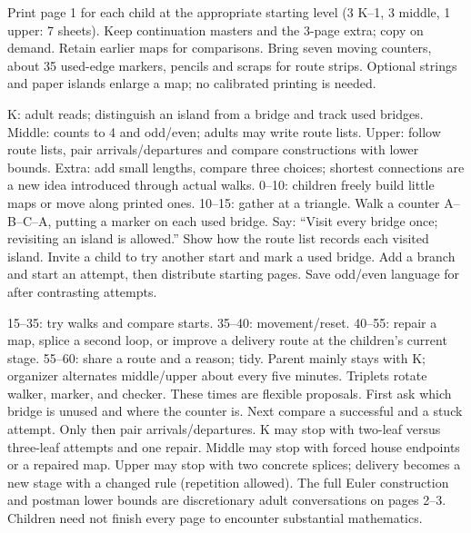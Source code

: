\documentclass[11pt]{article}
\begin{document}
Print page 1 for each child at the appropriate starting level (3 K--1, 3 middle, 1 upper: 7 sheets). Keep continuation masters and the 3-page extra; copy on demand. Retain earlier maps for comparisons. Bring seven moving counters, about 35 used-edge markers, pencils and scraps for route strips. Optional strings and paper islands enlarge a map; no calibrated printing is needed.

K: adult reads; distinguish an island from a bridge and track used bridges. Middle: counts to 4 and odd/even; adults may write route lists. Upper: follow route lists, pair arrivals/departures and compare constructions with lower bounds. Extra: add small lengths, compare three choices; shortest connections are a new idea introduced through actual walks.
0--10: children freely build little maps or move along printed ones. 10--15: gather at a triangle. Walk a counter A--B--C--A, putting a marker on each used bridge. Say: ``Visit every bridge once; revisiting an island is allowed.'' Show how the route list records each visited island. Invite a child to try another start and mark a used bridge. Add a branch and start an attempt, then distribute starting pages. Save odd/even language for after contrasting attempts.

15--35: try walks and compare starts. 35--40: movement/reset. 40--55: repair a map, splice a second loop, or improve a delivery route at the children's current stage. 55--60: share a route and a reason; tidy. Parent mainly stays with K; organizer alternates middle/upper about every five minutes. Triplets rotate walker, marker, and checker. These times are flexible proposals.
First ask which bridge is unused and where the counter is. Next compare a successful and a stuck attempt. Only then pair arrivals/departures. K may stop with two-leaf versus three-leaf attempts and one repair. Middle may stop with forced house endpoints or a repaired map. Upper may stop with two concrete splices; delivery becomes a new stage with a changed rule (repetition allowed). The full Euler construction and postman lower bounds are discretionary adult conversations on pages 2--3. Children need not finish every page to encounter substantial mathematics.
\newpage
\end{document}
